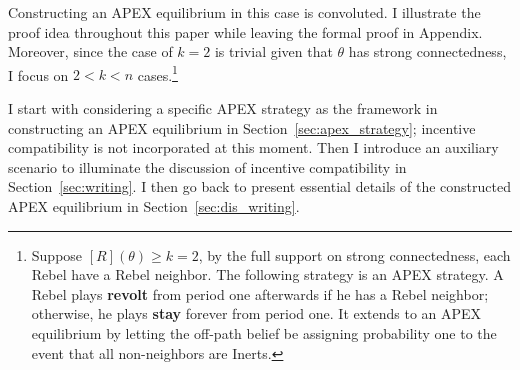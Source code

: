 \documentclass[12pt,letter]{article}
\theoremstyle{definition}
\theoremstyle{definition}
\theoremstyle{remark}
\theoremstyle{claim}
\begin{document}
Constructing an APEX equilibrium in this case is convoluted. I illustrate the proof idea throughout this paper while leaving the formal proof in Appendix. Moreover, since the case of $k=2$ is trivial given that $\theta$ has strong connectedness, I focus on $2<k<n$ cases.\footnote{Suppose $[R](\theta)\geq k=2$, by the full support on strong connectedness, each Rebel have a Rebel neighbor. The following strategy is an APEX strategy. A Rebel plays \textbf{revolt} from period one afterwards if he has a Rebel neighbor; otherwise, he plays \textbf{stay} forever from period one. It extends to an APEX equilibrium by letting the off-path belief be assigning probability one to the event that all non-neighbors are Inerts.} 

I start with considering a specific APEX strategy as the framework in constructing an APEX equilibrium in Section~\ref{sec:apex_strategy}; incentive compatibility is not incorporated at this moment. Then I introduce an auxiliary scenario to illuminate the discussion of incentive compatibility in Section~\ref{sec:writing}. I then go back to present essential details of the constructed APEX equilibrium in Section~\ref{sec:dis_writing}. 
\end{document}
